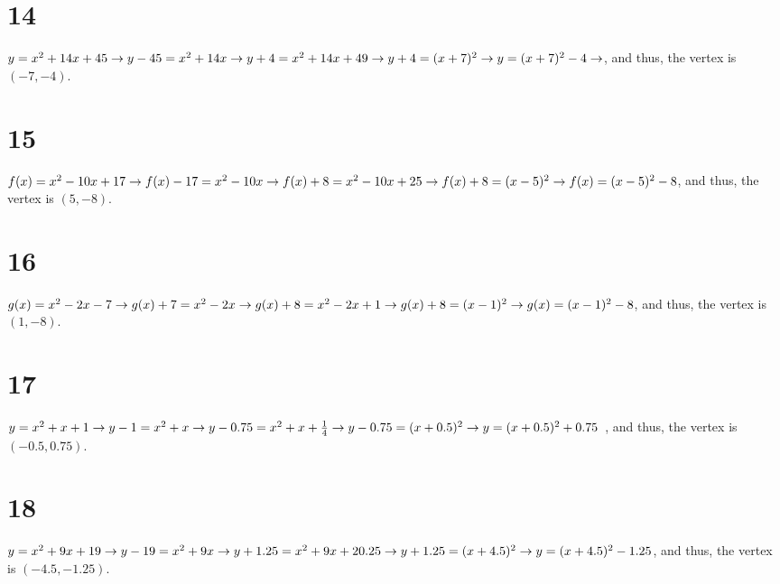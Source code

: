 \documentclass{article}
\theoremstyle{definition}
\begin{document}
\section*{14}
$y=x^2+14x+45\newline\rightarrow y-45=x^2+14x\newline\rightarrow y+4=x^2+14x+49\newline\rightarrow y+4=(x+7)^2\newline\rightarrow y=(x+7)^2-4\newline
\rightarrow$, and thus, the vertex is $(-7,-4)$.

\section*{15}
$f(x)=x^2-10x+17\newline\rightarrow f(x)-17=x^2-10x\newline\rightarrow f(x)+8=x^2-10x+25\newline\rightarrow f(x)+8=(x-5)^2\newline\rightarrow 
f(x)=(x-5)^2-8$, and thus, the vertex is $(5,-8)$.

\section*{16}
$g(x)=x^2-2x-7\newline\rightarrow g(x)+7=x^2-2x\newline\rightarrow g(x)+8=x^2-2x+1\newline\rightarrow g(x)+8=(x-1)^2\newline\rightarrow g(x)=(x-1)^2-8$, 
and thus, the vertex is $(1,-8)$.

\section*{17}
$y=x^2+x+1\newline\rightarrow y-1=x^2+x\newline\rightarrow y-0.75=x^2+x+\frac{1}{4}\newline\rightarrow y-0.75=(x+0.5)^2\newline\rightarrow y=(x+0.5)^2+0.75$
, and thus, the vertex is $(-0.5,0.75)$.

\section*{18}
$y=x^2+9x+19\newline\rightarrow y-19=x^2+9x\newline\rightarrow y+1.25=x^2+9x+20.25\newline\rightarrow y+1.25=(x+4.5)^2\newline\rightarrow y=(x+4.5)^2-1.25
$, and thus, the vertex is $(-4.5,-1.25)$.
\end{document}
